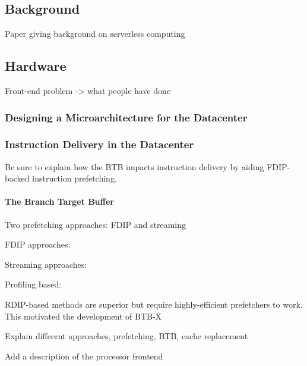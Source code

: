 \documentclass[../main.tex]{subfiles}
\begin{document}
\ifx\chapincluded\undefined
  \begin{refsection}
 \fi

\chapter{Background}
\label{chap:background}

Paper giving background on serverless computing \cite{van2018serverless}

\section{Hardware}

Front-end problem -> what people have done

\subsection{Designing a Microarchitecture for the Datacenter}
\cite{kanev15_profil,ferdman12_clear_cloud}


\subsection{Instruction Delivery in the Datacenter}
\label{sec:instr-delivery}
Be sure to explain how the BTB impacts instruction delivery by aiding FDIP-backed instruction prefetching.

\subsubsection{The Branch Target Buffer}
\label{sec:btb-background}

Two prefetching approaches: FDIP and streaming


FDIP approaches: \cite{reinman99_fetch_direc_instr_prefet, kumar17_boomer,kumar18_blast_throug_front_end_bottl_with_shotg,kumar20_shoot_down_server_front_end_bottl}

Streaming approaches:
\cite{ferdman08_tempor,ferdman11_proac_instr_fetch,kaynak13_shift,kaynak15_confl}

Profiling based:

RDIP-based methods are superior but require highly-efficient prefetchers to work. This motivated the development of BTB-X

Explain diffeernt approaches, prefetching, BTB, cache replacement

Add a description of the processor frontend


\end{refsection}
\end{document}
